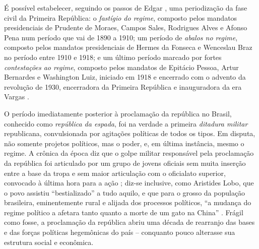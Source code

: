 É possível estabelecer, seguindo os passos de Edgar , uma periodização da fase civil da Primeira República: o \textit{fastígio do regime}, composto pelos mandatos presidenciais de Prudente de Moraes, Campos Sales, Rodrigues Alves e Afonso Pena num período que vai de 1890 a 1910; um período de \textit{abalos no regime}, composto pelos mandatos presidenciais de Hermes da Fonseca e Wenceslau Braz no período entre 1910 e 1918; e um último período marcado por fortes \textit{contestações ao regime}, composto pelos mandatos de Epitácio Pessoa, Artur Bernardes e Washington Luiz, iniciado em 1918 e encerrado com o advento da revolução de 1930, encerradora da Primeira República e inauguradora da era Vargas \cite{carone_evolucao_1977}. 

O período imediatamente posterior à proclamação da república no Brasil, conhecido como \textit{república da espada}, foi na verdade a primeira \textit{ditadura militar} republicana, convulsionada por agitações políticas de todos os tipos. Em disputa, não somente projetos políticos, mas o poder, e, em última instância, mesmo o regime. A crônica da época diz que o golpe militar responsável pela proclamação da república foi articulado por um grupo de jovens oficiais sem muita inserção entre a base da tropa e sem maior articulação com o oficialato superior, convocado à última hora para a ação \cite[p.~16]{cardoso_govmil_1977}; diz-se inclusive, como Aristides Lobo, que o povo assistiu ``bestializado'' a tudo aquilo, e que para o grosso da população brasileira, eminentemente rural e alijada dos processos políticos, ``a mudança do regime político a afetara tanto quanto a morte de um gato na China'' \cite[p.~43]{basbaum_histsinc_1967}. Frágil como fosse, a proclamação da república abriu uma década de rearranjo das bases e das forças políticas hegemônicas do país -- conquanto pouco alterasse sua estrutura social e econômica.

